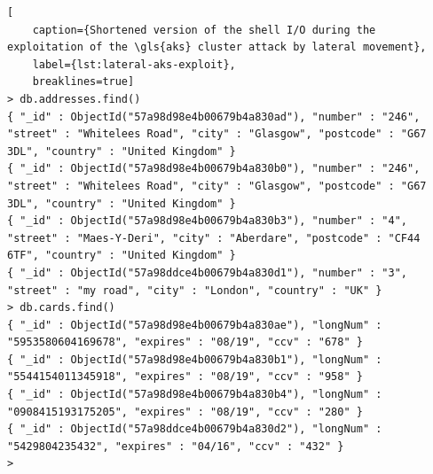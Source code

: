 \begin{lstlisting}[
	caption={Shortened version of the shell I/O during the exploitation of the \gls{aks} cluster attack by lateral movement},
	label={lst:lateral-aks-exploit},
	breaklines=true]
> db.addresses.find()
{ "_id" : ObjectId("57a98d98e4b00679b4a830ad"), "number" : "246", "street" : "Whitelees Road", "city" : "Glasgow", "postcode" : "G67 3DL", "country" : "United Kingdom" }
{ "_id" : ObjectId("57a98d98e4b00679b4a830b0"), "number" : "246", "street" : "Whitelees Road", "city" : "Glasgow", "postcode" : "G67 3DL", "country" : "United Kingdom" }
{ "_id" : ObjectId("57a98d98e4b00679b4a830b3"), "number" : "4", "street" : "Maes-Y-Deri", "city" : "Aberdare", "postcode" : "CF44 6TF", "country" : "United Kingdom" }
{ "_id" : ObjectId("57a98ddce4b00679b4a830d1"), "number" : "3", "street" : "my road", "city" : "London", "country" : "UK" }
> db.cards.find()
{ "_id" : ObjectId("57a98d98e4b00679b4a830ae"), "longNum" : "5953580604169678", "expires" : "08/19", "ccv" : "678" }
{ "_id" : ObjectId("57a98d98e4b00679b4a830b1"), "longNum" : "5544154011345918", "expires" : "08/19", "ccv" : "958" }
{ "_id" : ObjectId("57a98d98e4b00679b4a830b4"), "longNum" : "0908415193175205", "expires" : "08/19", "ccv" : "280" }
{ "_id" : ObjectId("57a98ddce4b00679b4a830d2"), "longNum" : "5429804235432", "expires" : "04/16", "ccv" : "432" }
>
\end{lstlisting}
